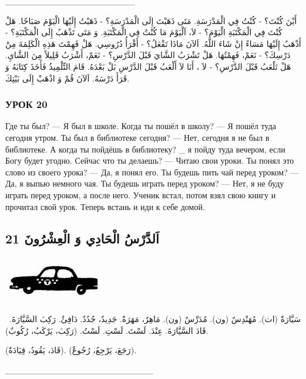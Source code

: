 \documentclass[a5paper]{article}
\begin{document}
\_\_\_\_\_\_\_\_\_\_\_\_\_\_\_\_\_\_\_\_\_

أَيْنَ كُنْتَ؟ - كُنْتُ فِي الْمَدْرَسَةِ. مَتَى ذَهَبْتَ إِلَى الْمَدْرَسَةِ؟ - ذَهَبْتُ إِلَيْهَا الْيَوْمَ صَبَاحًا. هَلْ كُنْتَ فِي الْمَكْتَبَةِ الْيَوْمَ؟ - لاَ، اَلْيَوْمَ مَا كُنْتُ فِي الْمَكْتَبَةِ. وَ مَتَى تَذْهَبُ إِلَى الْمَكْتَبَةِ؟ - أَذْهَبُ إِلَيْهَا مَسَاءً إِنْ شَاءَ اللَّهُ. اَلآنَ مَاذَا تَفْعَلُ؟ - أَقْرَأُ دُرُوسِي. هَلْ فَهِمْتَ هَذِهِ الْكَلِمَةَ مِنْ دَرْسِكَ؟ - نَعَمْ، فَهِمْتُهَا. هَلْ تَشْرَبُ الشَّايَ قَبْلَ الدَّرْسِ؟ - نَعَمْ، أَشْرَبُ قَلِيلاً مِنَ الشَّايِ. هَلْ تَلْعَبُ قَبْلَ الدَّرْسِ؟ - لاَ ، أَنَا لاَ أَلْعَبُ قَبْلَ الدَّرْسِ بَلْ بَعْدَهُ. قَامَ التِّلْمِيذُ فَأَخَذَ كِتَابَهُ وَ قَرَأَ دَرْسَهُ. اَلآنَ قُمْ وَ اذْهَبْ إِلَى بَيْتِكَ.

\subsubsection{УРОК 20}
Где ты был? — Я был в школе. Когда ты пошёл в школу? — Я пошёл туда сегодня утром. Ты был в библиотеке сегодня? — Нет, сегодня я не был в библиотеке. А когда ты пойдёшь в библиоте­ку? \_ я пойду туда вечером, если Богу будет угодно. Сейчас что ты делаешь? — Читаю свои уроки. Ты понял это слово из своего урока? — Да, я понял его. Ты будешь пить чай перед уроком? — Да, я выпью немного чая. Ты будешь играть перед уроком? — Нет, я не буду играть перед уроком, а после него. Ученик встал, потом взял свою книгу и прочитал свой урок. Теперь встань и иди к себе домой.

\subsection{21 اَلدَّرْسُ الْحَادِي وَ الْعِشْرُونَ}
 \includegraphics[width=1.75in,height=0.802in]{MuhammadBagauddinlatinized-img035.jpg} 

\ سَيَّارَةٌ (ات). مُهَنْدِسٌ (ون). مُدَرِّسٌ (ون). مَاهِرٌ، مَهَرَةٌ. جَدِيدٌ، جُدُدٌ. دَافِئٌ. رَكِبَ السَّيَّارَةَ. قَادَ السَّيَّارَةَ. عِنْدَ. لَسْتَ. لَسْتِ. لَسْتُ. (رَكِبَ، يَرْكَبُ، رُكُوبٌ). 

(قَادَ، يَقُودُ، قِيَادَةٌ). (رَجَعَ، يَرْجِعُ، رُجُوعٌ).

\_\_\_\_\_\_\_\_\_\_\_\_\_\_\_\_\_\_\_\_\_\_\_\_
\end{document}
